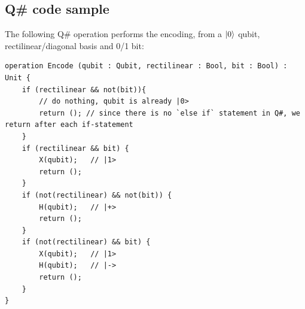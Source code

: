 \documentclass[oneside,a4paper]{article}
\begin{document}
\subsection{Q\# code sample}
The following Q\# operation performs the encoding, from a $\ket{0}$ qubit, rectilinear/diagonal basis and 0/1 bit:

\begin{lstlisting}[caption={\texttt{Operations.qs}}]
operation Encode (qubit : Qubit, rectilinear : Bool, bit : Bool) : Unit {
    if (rectilinear && not(bit)){
        // do nothing, qubit is already |0>
        return (); // since there is no `else if` statement in Q#, we return after each if-statement
    }
    if (rectilinear && bit) {
        X(qubit);   // |1>
        return ();
    }
    if (not(rectilinear) && not(bit)) {
        H(qubit);   // |+>
        return ();
    }
    if (not(rectilinear) && bit) {
        X(qubit);   // |1>
        H(qubit);   // |->
        return ();
    }
}
\end{lstlisting}



\end{document}
